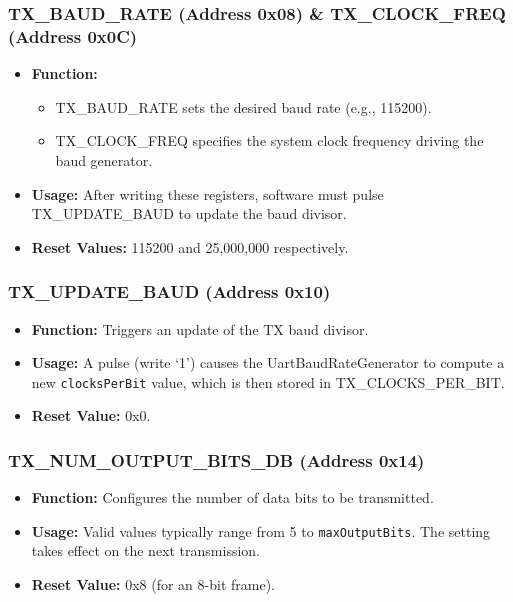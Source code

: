 \subsubsection{TX\_BAUD\_RATE (Address 0x08) \& TX\_CLOCK\_FREQ (Address 0x0C)}
\begin{itemize}[noitemsep]
    \item \textbf{Function:} 
    \begin{itemize}
        \item TX\_BAUD\_RATE sets the desired baud rate (e.g., 115200).
        \item TX\_CLOCK\_FREQ specifies the system clock frequency driving the baud generator.
    \end{itemize}
    \item \textbf{Usage:} After writing these registers, software must pulse TX\_UPDATE\_BAUD to update the baud divisor.
    \item \textbf{Reset Values:} 115200 and 25,000,000 respectively.
\end{itemize}

\subsubsection{TX\_UPDATE\_BAUD (Address 0x10)}
\begin{itemize}[noitemsep]
    \item \textbf{Function:} Triggers an update of the TX baud divisor.
    \item \textbf{Usage:} A pulse (write ‘1’) causes the UartBaudRateGenerator to compute a new \texttt{clocksPerBit} value, which is then stored in TX\_CLOCKS\_PER\_BIT.
    \item \textbf{Reset Value:} 0x0.
\end{itemize}

\subsubsection{TX\_NUM\_OUTPUT\_BITS\_DB (Address 0x14)}
\begin{itemize}[noitemsep]
    \item \textbf{Function:} Configures the number of data bits to be transmitted.
    \item \textbf{Usage:} Valid values typically range from 5 to \texttt{maxOutputBits}. The setting takes effect on the next transmission.
    \item \textbf{Reset Value:} 0x8 (for an 8-bit frame).
\end{itemize}

